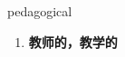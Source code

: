 
\begin{frame}
{\huge pedagogical}
\begin{center}
\begin{enumerate}\Large
  \item \textbf{教师的，教学的}
\end{enumerate}
\end{center}
\end{frame}

